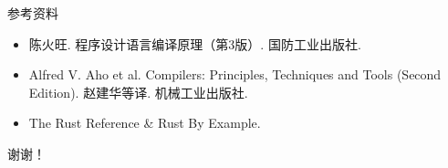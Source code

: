 \documentclass[aspectratio=169]{ctexbeamer}
\begin{document}
\begin{frame}{参考资料}
    \begin{itemize}
        \item 陈火旺. 程序设计语言编译原理（第3版）. 国防工业出版社.
        \item Alfred V. Aho et al. Compilers: Principles, Techniques and Tools (Second Edition). 赵建华等译. 机械工业出版社.
        \item The Rust Reference \& Rust By Example.
    \end{itemize}
\end{frame}

\begin{frame}
    \begin{center}
        \Huge 谢谢！
    \end{center}
\end{frame}
\end{document}
